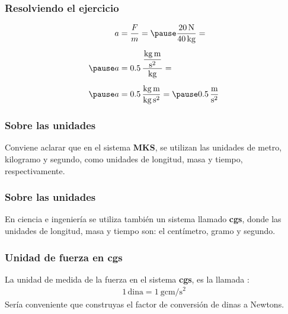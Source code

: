 \documentclass[14pt]{beamer}
\begin{document}
\begin{frame}
\frametitle{Resolviendo el ejercicio}
\pause
\begin{eqnarray*}
\begin{aligned}
a &= \dfrac{F}{m} = \pause \dfrac{\SI{20}{\newton}}{\SI{40}{\kilo\gram}} = \\[0.5em] \pause
a &= 0.5 \, \dfrac{\dfrac{\unit{\kilo\gram\meter}}{\unit{\square\second}}}{\unit{\kilo\gram}} = \\[0.5em] \pause 
a &= 0.5 \, \dfrac{\unit{\kilo\gram\meter}}{\unit{\kilo\gram\square\second}} = \pause \SI[per-mode=fraction]{0.5}{\meter\per\square\second}
\end{aligned}
\end{eqnarray*}
\end{frame}
\begin{frame}
\frametitle{Sobre las unidades}
Conviene aclarar que en el sistema \textbf{MKS}, \pause se utilizan las unidades de metro, kilogramo y segundo, como unidades de longitud, masa y tiempo, respectivamente.
\end{frame}
\begin{frame}
\frametitle{Sobre las unidades}
En ciencia e ingeniería se utiliza también un sistema llamado \textbf{cgs}, \pause donde las unidades de longitud, masa y tiempo son: el centímetro, gramo y segundo.
\end{frame}
\begin{frame}
\frametitle{Unidad de fuerza en cgs}
La unidad de medida de la fuerza en el sistema \textbf{cgs}, es la llamada :
\pause
\begin{align*}
1 \, \text{dina} = \SI[per-mode=fraction]{1}{\gram\centi\meter\per\square\second}
\end{align*}
Sería conveniente que construyas el factor de conversión de dinas a Newtons.
\end{frame}
\end{document}
